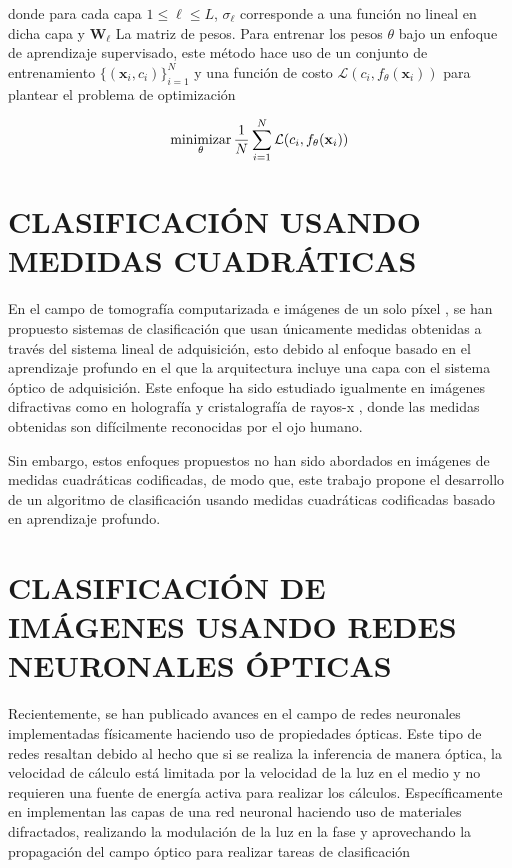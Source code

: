 donde para cada capa $1 \leq \ell \leq L$, $\sigma_\ell$ corresponde a una función no lineal en dicha capa y $\mathbf{W}_\ell$ La matriz de pesos. Para entrenar los pesos $\theta$ bajo un enfoque de aprendizaje supervisado, este método hace uso de un conjunto de entrenamiento $\{(\mathbf{x}_i, c_i) \}_{i=1}^{N}$ y una función de costo $\mathcal{L}( c_i,  f_\theta(\mathbf{x}_i))$ para plantear el problema de optimización 

\begin{equation}
    \operatorname*{minimizar}_\theta \frac{1}{N}\sum_{i=1}^{N} \mathcal{L}( c_i,  f_\theta(\mathbf{x}_i))
    \label{eq:optimización_nn}
\end{equation}

\section{CLASIFICACIÓN USANDO MEDIDAS CUADRÁTICAS}
En el campo de tomografía computarizada  e imágenes de un solo píxel , se han propuesto sistemas de clasificación que usan únicamente medidas obtenidas a través del sistema lineal de adquisición, esto debido al enfoque basado en el aprendizaje profundo en el que la arquitectura incluye una capa con el sistema óptico de adquisición. Este enfoque ha sido estudiado igualmente en imágenes difractivas como en holografía  y cristalografía de rayos-x , donde las medidas obtenidas son difícilmente reconocidas por el ojo humano. 

Sin embargo, estos enfoques propuestos no han sido abordados en imágenes de medidas cuadráticas codificadas, de modo que, este trabajo propone el desarrollo de un algoritmo de clasificación usando medidas cuadráticas codificadas basado en aprendizaje profundo. 


\section{CLASIFICACIÓN DE IMÁGENES USANDO REDES NEURONALES ÓPTICAS}


Recientemente, se han publicado avances en el campo de redes neuronales implementadas físicamente haciendo uso de propiedades ópticas. Este tipo de redes resaltan debido al hecho que si se realiza la inferencia de manera óptica, la velocidad de cálculo está limitada por la velocidad de la luz en el medio y no requieren una fuente de energía activa para realizar los cálculos. Específicamente en  implementan las capas de una red neuronal haciendo uso de materiales difractados, realizando la modulación de la luz en la fase y aprovechando la propagación del campo óptico para realizar tareas de clasificación


